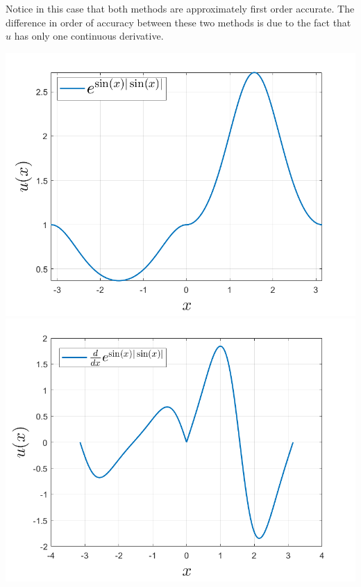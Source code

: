 \documentclass{article}
\begin{document}
\begin{itemize}
\begin{center}
    \end{center}
    Notice in this case that both methods are approximately first order accurate. The difference in order of accuracy between these two methods is due to the fact that $u$ has only one continuous derivative.
    \begin{center}
        \includegraphics[scale = 0.3]{plot exp_sin_abs_sin.png}
        \includegraphics[scale = 0.3]{uprimemm.png}
    \end{center}

\end{itemize}
\end{document}
